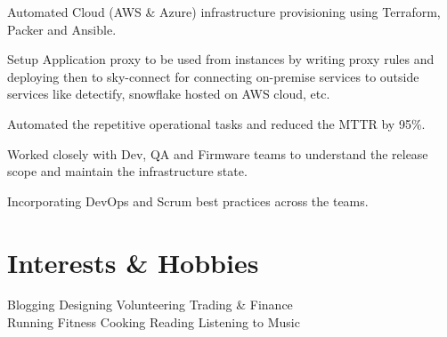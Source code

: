 \documentclass[a4paper]{deedy-resume-openfont}
\begin{document}
\begin{minipage}[t]{0.66\textwidth}
\begin{tightemize}
\item Automated Cloud (AWS \& Azure) infrastructure provisioning using Terraform, Packer and Ansible.
\item Setup Application proxy to be used from instances by writing proxy rules and deploying then to sky-connect for connecting on-premise services to outside services like detectify, snowflake hosted on AWS cloud, etc.
\item Automated the repetitive operational tasks and reduced the MTTR by 95\%.
\item Worked closely with Dev, QA and Firmware teams to understand the release scope and maintain the infrastructure state.
\item Incorporating DevOps and Scrum best practices across the teams.
\end{tightemize}
\sectionsep


\section{Interests \& Hobbies}
Blogging \textbullet{} Designing \textbullet{} Volunteering \textbullet{} Trading \& Finance \\
Running \textbullet{} Fitness \textbullet{} Cooking \textbullet{} Reading  \textbullet{} Listening to Music


\end{minipage} 


\hfill

\vspace{\topsep}
\vspace{\topsep}
\vspace{\topsep}
\vspace{\topsep}
\end{document}
